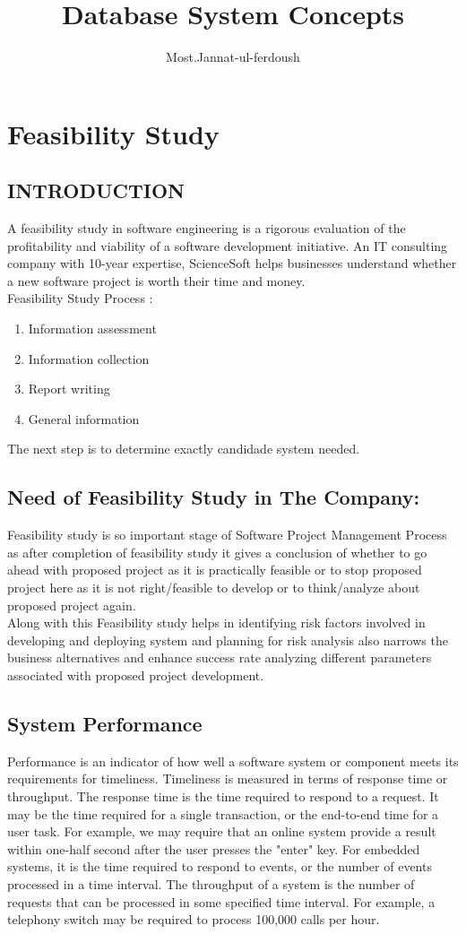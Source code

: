 \documentclass[a4paper,12pt]{book}
\title{Database System Concepts}
\author{Most.Jannat-ul-ferdoush}
\begin{document}
	\maketitle
	\newpage
	
	\chapter{Feasibility Study}
	\section{INTRODUCTION}
	A feasibility study in software engineering is a rigorous evaluation of the profitability and viability of a software development initiative. An IT consulting company with 10-year expertise, ScienceSoft helps businesses understand whether a new software project is worth their time and money.
	\\Feasibility Study Process : \\
	\begin{enumerate}
	\item	Information assessment
	\item Information collection
	\item Report writing
	\item General information
		\end{enumerate}
	The next step is to determine exactly candidade system needed.\\
	\section{Need of Feasibility Study in The Company:} 
	Feasibility study is so important stage of Software Project Management Process as after completion of feasibility study it gives a conclusion of whether to go ahead with proposed project as it is practically feasible or to stop proposed project here as it is not right/feasible to develop or to think/analyze about proposed project again.\\
	Along with this Feasibility study helps in identifying risk factors involved in developing and deploying system and planning for risk analysis also narrows the business alternatives and enhance success rate analyzing different parameters associated with proposed project development.
	\section{System Performance}
	Performance is an indicator of how well a software system or component meets its requirements for timeliness. Timeliness is measured in terms of response time or throughput. The response time is the time required to respond to a request. It may be the time required for a single transaction, or the end-to-end time for a user task. For example, we may require that an online system provide a result within one-half second after the user presses the "enter" key. For embedded systems, it is the time required to respond to events, or the number of events processed in a time interval. The throughput of a system is the number of requests that can be processed in some specified time interval. For example, a telephony switch may be required to process 100,000 calls per hour.
	
\end{document}
